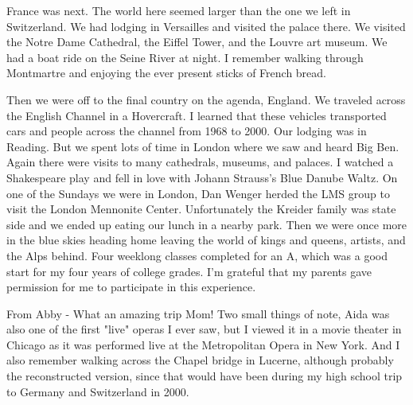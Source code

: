 France was next.
The world here seemed larger than the one we left in Switzerland.
We had lodging in Versailles and visited the palace there.
We visited the Notre Dame Cathedral, the Eiffel Tower, and the Louvre art museum.
We had a boat ride on the Seine River at night.
I remember walking through Montmartre and enjoying the ever present sticks of French bread.

Then we were off to the final country on the agenda, England.
We traveled across the English Channel in a Hovercraft.
I learned that these vehicles transported cars and people across the channel from 1968 to 2000.
Our lodging was in Reading.
But we spent lots of time in London where we saw and heard Big Ben.
Again there were visits to many cathedrals, museums, and palaces.
I watched a Shakespeare play and fell in love with Johann Strauss's Blue Danube Waltz.
On one of the Sundays we were in London, Dan Wenger herded the LMS group to visit the London Mennonite Center.
Unfortunately the Kreider family was state side and we ended up eating our lunch in a nearby park.
Then we were once more in the blue skies heading home leaving the world of kings and queens, artists, and the Alps behind.
Four weeklong classes completed for an A, which was a good start for my four years of college grades.
I'm grateful that my parents gave permission for me to participate in this experience.

From Abby - What an amazing trip Mom! Two small things of note, Aida was also one of the first "live" operas I ever saw, but I viewed it in a movie theater in Chicago as it was performed live at the Metropolitan Opera in New York.
And I also remember walking across the Chapel bridge in Lucerne, although probably the reconstructed version, since that would have been during my high school trip to Germany and Switzerland in 2000.






